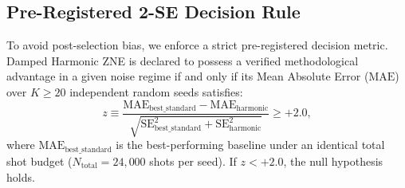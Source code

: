 \subsection{Pre-Registered 2-SE Decision Rule}
To avoid post-selection bias, we enforce a strict pre-registered decision metric. Damped Harmonic ZNE is declared to possess a verified methodological advantage in a given noise regime if and only if its Mean Absolute Error ($\mathrm{MAE}$) over $K \ge 20$ independent random seeds satisfies:
\begin{equation}
z \equiv \frac{\mathrm{MAE}_{\mathrm{best\_standard}} - \mathrm{MAE}_{\mathrm{harmonic}}}{\sqrt{\mathrm{SE}^2_{\mathrm{best\_standard}} + \mathrm{SE}^2_{\mathrm{harmonic}}}} \ge +2.0,
\label{eq:decision_rule}
\end{equation}
where $\mathrm{MAE}_{\mathrm{best\_standard}}$ is the best-performing baseline under an identical total shot budget ($N_{\mathrm{total}} = 24{,}000$ shots per seed). If $z < +2.0$, the null hypothesis holds.

